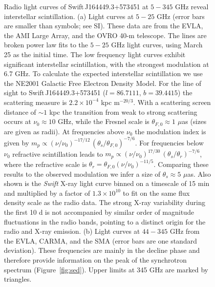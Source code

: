 \clearpage 
\begin{figure}
\centerline{}
\caption[]{\small 
 Radio light curves of Swift\,J164449.3+573451 at
$5-345$ GHz reveal interstellar scintillation.  (a) Light curves at
$5-25$ GHz (error bars are smaller than symbols; see SI).  These data 
are from the EVLA, the AMI Large Array, and the OVRO
40-m telescope. The lines are broken power law fits to the $5-25$ GHz
light curves, using March 25 as the initial time.  The low
frequency light curves exhibit significant interstellar scintillation,
with the strongest modulation at 6.7 GHz.  To calculate the expected
interstellar scintillation we use the NE2001 Galactic Free Electron
Density Model\cite{cl02}.  For the line of sight to Swift\,J164449.3+573451 
($l=86.7111$, $b=39.4415$) the scattering measure is $2.2\times 10^{-4}$ kpc
m$^{-20/3}$.  With a scattering screen distance of $\sim 1$ kpc the
transition from weak to strong scattering occurs\cite{gn06} at 
$\nu_0\approx 10$ GHz, while the Fresnel scale is
$\theta_{F,0}\approx 1$ $\mu$as (sizes are given as radii).  At
frequencies above $\nu_0$ the modulation index is given by $m_p\propto
(\nu/\nu_0)^{-17/12}\,(\theta_s/\theta_{F,0})^{-7/6}$.  For
frequencies below $\nu_0$ refractive scintillation leads to
$m_p\propto (\nu/\nu_0)^{17/30}\,(\theta_s/\theta_r)^{-7/6}$, where
the refractive scale is $\theta_r=\theta_{F,0}(\nu/\nu_0)^{-11/5}$.
Comparing these results to the observed modulation we infer a size of
$\theta_s\approx 5$ $\mu$as.  Also shown is the {\it Swift} X-ray
light curve\cite{burrows11} binned on a timescale of 15 min and
multiplied by a factor of $1.3\times 10^{10}$ to fit on the same flux
density scale as the radio data.  The strong X-ray variability during
the first 10 d is not accompanied by similar order of magnitude
fluctuations in the radio bands, pointing to a distinct origin for the
radio and X-ray emission.  (b) Light curves at $44-345$ GHz from the
EVLA, CARMA, and the SMA (error bars are one standard deviation).
These frequencies are mainly in the decline phase and therefore
provide information on the peak of the synchrotron spectrum
(Figure~\ref{fig:sed}).  Upper limits at 345 GHz are marked by
triangles.
}
\label{fig:lc} 
\end{figure}


